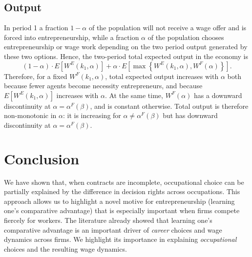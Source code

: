 \documentclass[12pt,american]{paper}
\theoremstyle{remark}
\begin{document}



\subsection{Output}
In period 1 a fraction $1-\alpha$ of the population will not receive a wage offer and is forced into entrepreneurship, while a fraction $\alpha$ of the population chooses entrepreneurship or wage work depending on the two period output generated by these two options. Hence, the two-period total expected output in the economy is
\[
(1-\alpha) \cdot E[W^E(k_1,\alpha)] + \alpha \cdot E[ \max\left\lbrace W^E(k_1,\alpha), W^F(\alpha) \right\rbrace ].
\]
Therefore, for a fixed $W^F(k_1,\alpha)$, total expected output increases with $\alpha$ both because fewer agents become necessity entrepreneurs, and because $E[W^E(k_1,\alpha)]$ increases with $\alpha$. At the same time, $W^F(\alpha)$ has a downward discontinuity at $\alpha=\alpha^F(\beta)$, and is constant otherwise.  Total output is therefore non-monotonic in $\alpha$: it is increasing for $\alpha \neq \alpha^F(\beta)$ but has downward discontinuity at $\alpha=\alpha^F(\beta)$.




\section{Conclusion}\label{conclusion}
%
We have shown that, when contracts are incomplete, occupational choice can be partially explained by the difference in decision rights across occupations. This approach allows us to highlight a novel motive for entrepreneurship (learning one's comparative advantage) that is especially important when firms compete fiercely for workers. The literature already showed  that learning one's comparative advantage is an important driver of \textit{career} choices and wage dynamics across firms. We highlight its importance in explaining \textit{occupational} choices and the resulting wage dynamics.
\end{document}
